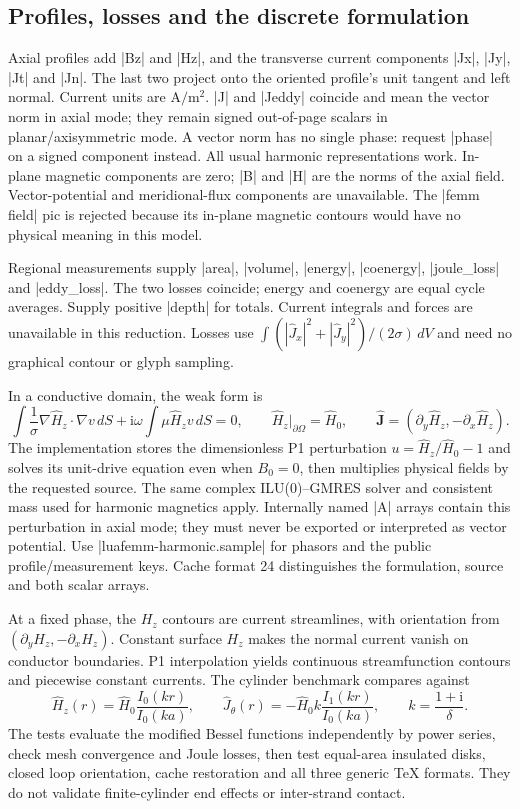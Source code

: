 \subsection{Profiles, losses and the discrete formulation}
Axial profiles add |Bz| and |Hz|, and the transverse current components
|Jx|, |Jy|, |Jt| and |Jn|. The last two project onto the oriented profile's
unit tangent and left normal. Current units are $\mathrm{A/m^2}$.
|J| and |Jeddy| coincide and mean the vector norm in axial mode; they remain
signed out-of-page scalars in planar/axisymmetric mode. A vector norm has no
single phase: request |phase| on a signed component instead. All usual harmonic
representations work. In-plane magnetic components are zero; |B| and |H|
are the norms of the axial field. Vector-potential and meridional-flux
components are unavailable. The |femm field| pic is rejected because its
in-plane magnetic contours would have no physical meaning in this model.

Regional measurements supply |area|, |volume|, |energy|, |coenergy|,
|joule_loss| and |eddy_loss|. The two losses coincide; energy and coenergy
are equal cycle averages. Supply positive |depth| for totals. Current integrals
and forces are unavailable in this reduction. Losses use
$\int(|\widehat J_x|^2+|\widehat J_y|^2)/(2\sigma)\,dV$ and need no graphical
contour or glyph sampling.

In a conductive domain, the weak form is
\[
 \int\frac1\sigma\nabla\widehat H_z\mathbin{\cdot}\nabla v\,dS
 +\mathrm i\omega\int\mu\widehat H_zv\,dS=0,
 \qquad \widehat H_z|_{\partial\Omega}=\widehat H_0,
 \qquad \widehat{\mathbf J}=(\partial_y\widehat H_z,-\partial_x\widehat H_z).
\]
The implementation stores the dimensionless P1 perturbation
$u=\widehat H_z/\widehat H_0-1$ and solves its unit-drive equation even when
$B_0=0$, then multiplies physical fields by the requested source. The same
complex ILU(0)--GMRES solver and consistent mass used for harmonic magnetics
apply. Internally named |A| arrays contain this perturbation in axial mode;
they must never be exported or interpreted as vector potential. Use
|luafemm-harmonic.sample| for phasors and the public profile/measurement keys.
Cache format 24 distinguishes the formulation, source and both scalar arrays.

At a fixed phase, the $H_z$ contours are current streamlines, with orientation
from $(\partial_yH_z,-\partial_xH_z)$. Constant surface $H_z$ makes the normal
current vanish on conductor boundaries. P1 interpolation yields continuous
streamfunction contours and piecewise constant currents. The cylinder benchmark
compares against
\[
 \widehat H_z(r)=\widehat H_0\frac{I_0(kr)}{I_0(ka)},\qquad
 \widehat J_\theta(r)=-\widehat H_0 k\frac{I_1(kr)}{I_0(ka)},\qquad
 k=\frac{1+\mathrm i}{\delta}.
\]
The tests evaluate the modified Bessel functions independently by power series,
check mesh convergence and Joule losses, then test equal-area insulated disks,
closed loop orientation, cache restoration and all three generic TeX formats.
They do not validate finite-cylinder end effects or inter-strand contact.
